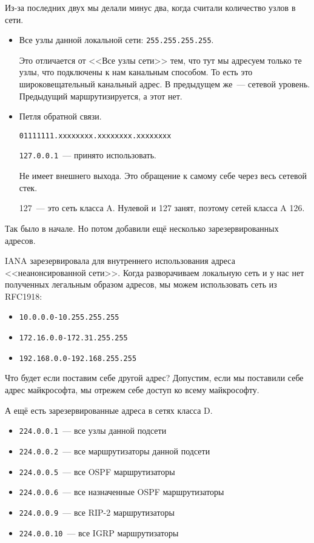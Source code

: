 Из-за последних двух мы делали минус два, когда считали количество узлов в сети.

\begin{itemize}
    \item Все узлы данной локальной сети: {\tt 255.255.255.255}.

    Это отличается от <<Все узлы сети>> тем, что тут мы адресуем только те узлы, что подключены к нам канальным способом. То есть это широковещательный канальный адрес. В предыдущем же~--- сетевой уровень. Предыдущий маршрутизируется, а этот нет.

    \item Петля обратной связи.

    {\tt 01111111.xxxxxxxx.xxxxxxxx.xxxxxxxx}

    {\tt 127.0.0.1}~--- принято использовать.

    Не имеет внешнего выхода. Это обращение к самому себе через весь сетевой стек. 

    127~--- это сеть класса A. Нулевой и 127 занят, поэтому сетей класса A 126.
\end{itemize}

Так было в начале. Но потом добавили ещё несколько зарезервированных адресов.

IANA зарезервировала для внутреннего использования адреса <<неанонсированной сети>>. Когда разворачиваем локальную сеть и у нас нет полученных легальным образом адресов, мы можем использовать сеть из RFC1918:

\begin{itemize}
    \item {\tt 10.0.0.0-10.255.255.255}
    \item {\tt 172.16.0.0-172.31.255.255}
    \item {\tt 192.168.0.0-192.168.255.255}
\end{itemize}

Что будет если поставим себе другой адрес? Допустим, если мы поставили себе адрес майкрософта, мы отрежем себе доступ ко всему майкрософту.

А ещё есть зарезервированные адреса в сетях класса D.

\begin{itemize}
    \item {\tt 224.0.0.1}~--- все узлы данной подсети
    \item {\tt 224.0.0.2}~--- все маршрутизаторы данной подсети
    \item {\tt 224.0.0.5}~--- все OSPF маршрутизаторы
    \item {\tt 224.0.0.6}~--- все назначенные OSPF маршрутизаторы
    \item {\tt 224.0.0.9}~--- все RIP-2 маршрутизаторы
    \item {\tt 224.0.0.10}~--- все IGRP маршрутизаторы
\end{itemize}

